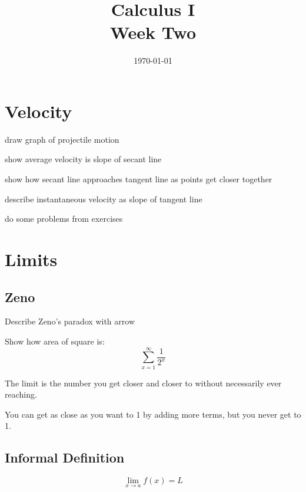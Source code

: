 \documentclass[letterpaper, landscape]{exam}
\author{}
\date{\today}
\title{Calculus I \\ Week Two}
\begin{document}
  \maketitle
  \tableofcontents

  \section{Velocity}

  \begin{itemize*}
    \item draw graph of projectile motion
    \item show average velocity is slope of secant line
    \item show how secant line approaches tangent line as points get closer
      together
    \item describe instantaneous velocity as slope of tangent line
    \item do some problems from exercises
  \end{itemize*}

  \section{Limits}

  \subsection{Zeno}
  \begin{itemize*}
    \item Describe Zeno's paradox with arrow
    \item Show how area of square is: 
      \[
        \sum_{x = 1}^\infty \frac{1}{2^x}
      \]

    \item The limit is the number you get closer and closer to without
      necessarily ever reaching.

    \item You can get as close as you want to 1 by adding more terms, but you
      never get to 1.

  \end{itemize*}

  \subsection{Informal Definition}

  \[
    \lim_{x \to a} f(x) = L
  \]
\end{document}

